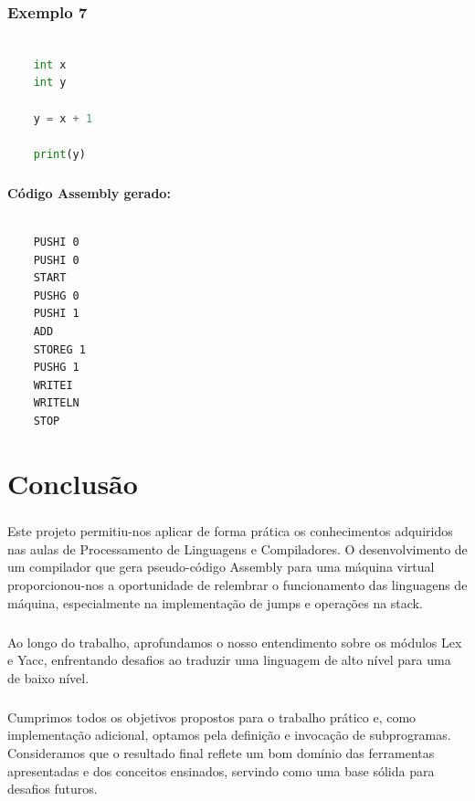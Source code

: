 \documentclass[11pt,a4paper]{report}
\begin{document}
    \subsection{Exemplo 7}
    \begin{lstlisting}[language=Python]
    
    int x
    int y
    
    y = x + 1
    
    print(y)
    \end{lstlisting}
    \paragraph{}
    \textbf{Código Assembly gerado:}
    \begin{lstlisting}
    
    PUSHI 0
    PUSHI 0
    START
    PUSHG 0
    PUSHI 1
    ADD
    STOREG 1
    PUSHG 1
    WRITEI
    WRITELN
    STOP
    \end{lstlisting}



\chapter{Conclusão}
\paragraph{}
Este projeto permitiu-nos aplicar de forma prática os conhecimentos adquiridos nas aulas de Processamento de Linguagens e Compiladores. O desenvolvimento de um compilador que gera pseudo-código Assembly para uma máquina virtual proporcionou-nos a oportunidade de relembrar o funcionamento das linguagens de máquina, especialmente na implementação de jumps e operações na stack.
\paragraph{}
Ao longo do trabalho, aprofundamos o nosso entendimento sobre os módulos Lex e Yacc, enfrentando desafios ao traduzir uma linguagem de alto nível para uma de baixo nível.
\paragraph{}
Cumprimos todos os objetivos propostos para o trabalho prático e, como implementação adicional, optamos pela definição e invocação de subprogramas. Consideramos que o resultado final reflete um bom domínio das ferramentas apresentadas e dos conceitos ensinados, servindo como uma base sólida para desafios futuros.
\end{document}
